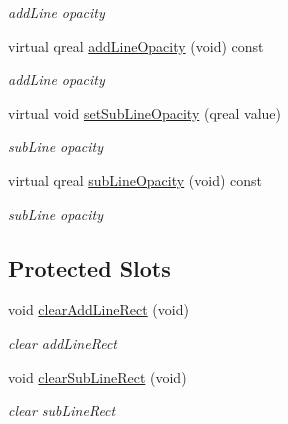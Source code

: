 \begin{DoxyCompactItemize}
\begin{DoxyCompactList}\small\item\em add\+Line opacity \end{DoxyCompactList}\item 
\mbox{\label{class_scroll_bar_data_a0c40e644c437e6117673e3b7457d4375}} 
virtual qreal \hyperlink{class_scroll_bar_data_a0c40e644c437e6117673e3b7457d4375}{add\+Line\+Opacity} (void) const
\begin{DoxyCompactList}\small\item\em add\+Line opacity \end{DoxyCompactList}\item 
\mbox{\label{class_scroll_bar_data_a01a12e1f8759bdc4431531a31921eb68}} 
virtual void \hyperlink{class_scroll_bar_data_a01a12e1f8759bdc4431531a31921eb68}{set\+Sub\+Line\+Opacity} (qreal value)
\begin{DoxyCompactList}\small\item\em sub\+Line opacity \end{DoxyCompactList}\item 
\mbox{\label{class_scroll_bar_data_a128435a7f44ba5221c6a2749c891ebeb}} 
virtual qreal \hyperlink{class_scroll_bar_data_a128435a7f44ba5221c6a2749c891ebeb}{sub\+Line\+Opacity} (void) const
\begin{DoxyCompactList}\small\item\em sub\+Line opacity \end{DoxyCompactList}\end{DoxyCompactItemize}
\subsection*{Protected Slots}
\begin{DoxyCompactItemize}
\item 
\mbox{\label{class_scroll_bar_data_a1bc7c535bce30228c12d9c1ba399a35b}} 
void \hyperlink{class_scroll_bar_data_a1bc7c535bce30228c12d9c1ba399a35b}{clear\+Add\+Line\+Rect} (void)
\begin{DoxyCompactList}\small\item\em clear add\+Line\+Rect \end{DoxyCompactList}\item 
\mbox{\label{class_scroll_bar_data_a4d5538b8fcfd8489923753d1e8c9f2cd}} 
void \hyperlink{class_scroll_bar_data_a4d5538b8fcfd8489923753d1e8c9f2cd}{clear\+Sub\+Line\+Rect} (void)
\begin{DoxyCompactList}\small\item\em clear sub\+Line\+Rect \end{DoxyCompactList}\end{DoxyCompactItemize}
